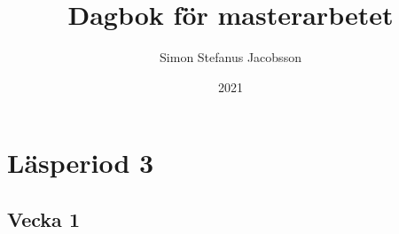 
\usepackage{textcomp} %

\title{{\Huge {}} Dagbok för masterarbetet {\Huge {}}}
\author{Simon Stefanus Jacobsson}
\date{2021}


\renewcommand{\thechapter}{\Roman{chapter}}


\maketitle
\tableofcontents

\chapter{Läsperiod 3}
\section{Vecka 1}


% 

% 

% 

% 

% 

% 

% 

